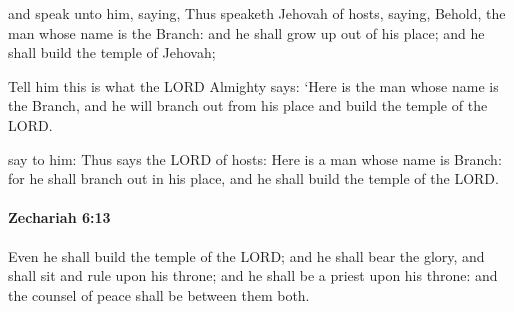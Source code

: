 			\begin{versebox}
					\item[BHS] 
					\item[LXX] 
					\item[ASV] and speak unto him, saying, Thus speaketh Jehovah of hosts, saying, Behold, the man whose name is the Branch: and he shall grow up out of his place; and he shall build the temple of Jehovah;
					\item[NIV] Tell him this is what the LORD Almighty says: ‘Here is the man whose name is the Branch, and he will branch out from his place and build the temple of the LORD.
					\item[NRSV] say to him: Thus says the LORD of hosts: Here is a man whose name is Branch: for he shall branch out in his place, and he shall build the temple of the LORD.
			\end{versebox}

		\paragraph{Zechariah 6:13} %
			\label{ZECHARIAH-6-13}

			Even he shall build the temple of the LORD; and he shall bear the glory, and shall sit and rule upon his throne; and he shall be a priest upon his throne: and the counsel of peace shall be between them both.

